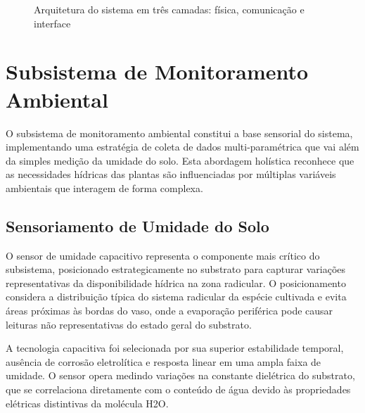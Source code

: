 \begin{figure}[htbp]
\centering
\caption{Arquitetura do sistema em três camadas: física, comunicação e interface}
\label{fig:arquitetura_sistema}
\end{figure}

\section{Subsistema de Monitoramento Ambiental}

O subsistema de monitoramento ambiental constitui a base sensorial do sistema, implementando uma estratégia de coleta de dados multi-paramétrica que vai além da simples medição da umidade do solo. Esta abordagem holística reconhece que as necessidades hídricas das plantas são influenciadas por múltiplas variáveis ambientais que interagem de forma complexa.

\subsection{Sensoriamento de Umidade do Solo}

O sensor de umidade capacitivo representa o componente mais crítico do subsistema, posicionado estrategicamente no substrato para capturar variações representativas da disponibilidade hídrica na zona radicular. O posicionamento considera a distribuição típica do sistema radicular da espécie cultivada e evita áreas próximas às bordas do vaso, onde a evaporação periférica pode causar leituras não representativas do estado geral do substrato.

A tecnologia capacitiva foi selecionada por sua superior estabilidade temporal, ausência de corrosão eletrolítica e resposta linear em uma ampla faixa de umidade. O sensor opera medindo variações na constante dielétrica do substrato, que se correlaciona diretamente com o conteúdo de água devido às propriedades elétricas distintivas da molécula H2O.

